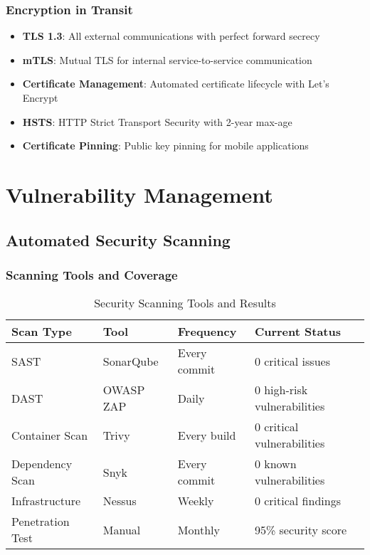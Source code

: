 \subsubsection{Encryption in Transit}

\begin{itemize}
    \item \textbf{TLS 1.3}: All external communications with perfect forward secrecy
    \item \textbf{mTLS}: Mutual TLS for internal service-to-service communication
    \item \textbf{Certificate Management}: Automated certificate lifecycle with Let's Encrypt
    \item \textbf{HSTS}: HTTP Strict Transport Security with 2-year max-age
    \item \textbf{Certificate Pinning}: Public key pinning for mobile applications
\end{itemize}

\section{Vulnerability Management}

\subsection{Automated Security Scanning}

\subsubsection{Scanning Tools and Coverage}

\begin{table}[H]
\centering
\caption{Security Scanning Tools and Results}
\begin{tabular}{|p{3cm}|p{3cm}|p{2cm}|p{4cm}|}
\hline
\textbf{Scan Type} & \textbf{Tool} & \textbf{Frequency} & \textbf{Current Status} \\
\hline
SAST & SonarQube & Every commit & 0 critical issues \\
\hline
DAST & OWASP ZAP & Daily & 0 high-risk vulnerabilities \\
\hline
Container Scan & Trivy & Every build & 0 critical vulnerabilities \\
\hline
Dependency Scan & Snyk & Every commit & 0 known vulnerabilities \\
\hline
Infrastructure & Nessus & Weekly & 0 critical findings \\
\hline
Penetration Test & Manual & Monthly & 95\% security score \\
\hline
\end{tabular}
\end{table}

